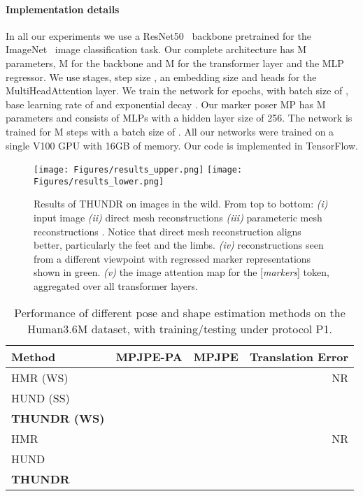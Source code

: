 \documentclass[10pt,twocolumn,letterpaper]{article}
\begin{document}
\vspace{-3mm}


\paragraph{Implementation details} In all our experiments we use a ResNet50~\cite{he2016identity} backbone pretrained for the ImageNet~\cite{imagenet} image classification task. 
Our complete architecture has M parameters, M for the backbone and M for the transformer layer and the MLP regressor. We use  stages, step size , an embedding size  and  heads for the MultiHeadAttention layer. We train the network for  epochs, with batch size of , base learning rate of  and exponential decay . Our marker poser MP has M parameters and consists of MLPs with a hidden layer size of 256. The network is trained for M steps with a batch size of . All our networks were trained on a single V100 GPU with 16GB of memory. Our code is implemented in TensorFlow.

\begin{figure*}[!ht]
\begin{center}
\texttt{[image: Figures/results\_upper.png]}
\texttt{[image: Figures/results\_lower.png]}
\end{center}
\caption{\small Results of THUNDR on images in the wild. From top to bottom: {\it (i)} input image {\it (ii)} direct mesh reconstructions  {\it (iii)} parameteric mesh reconstructions . Notice that direct mesh reconstruction aligns better, particularly the feet and the limbs. {\it (iv)} reconstructions seen from a different viewpoint with regressed marker representations shown in green. {\it (v)} the image attention map for the [\textit{markers}] token, aggregated over all transformer layers. }
\label{fig:Results}
\vspace{-3mm}
\end{figure*}

\begin{table*}[!htbp]
    \small
    \centering
    \begin{tabular}[t]{|l||r|r|r|}
    \hline
    \textbf{Method}  & {MPJPE-PA} & {MPJPE} & {Translation Error} \\ 
    \hline
    \hline
    HMR (WS) \cite{Kanazawa2018} &  &  &NR \\
    \hline    
    HUND (SS) \cite{zanfir2020neural} &  &  & \\
    \hline
    \textbf{THUNDR (WS)} &  &  &  \\
    \hline
    \hline
    HMR \cite{Kanazawa2018} &  & & NR \\
    \hline
    HUND \cite{zanfir2020neural} &  & &  \\
    \hline
    \textbf{THUNDR} &  &  &  \\
    \hline
    \end{tabular}
    \caption{\small Performance of different pose and shape estimation methods on the Human3.6M dataset, with training/testing under protocol P1.}
\label{tbl:H36MP1}
\end{table*}
\end{document}
